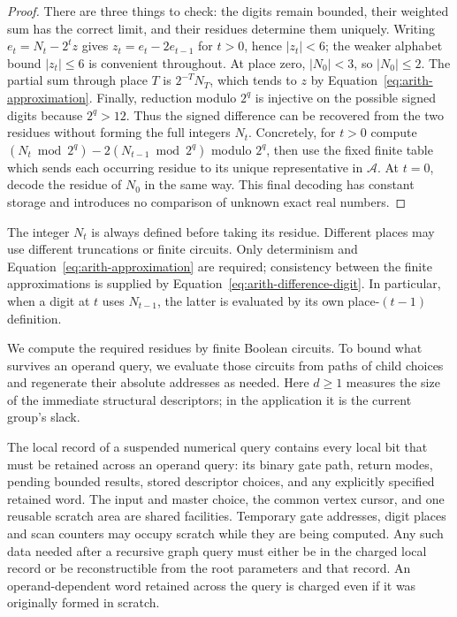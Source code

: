 \begin{proof}
There are three things to check: the digits remain bounded, their weighted sum has the correct limit, and their residues determine them uniquely. Writing $e_t=N_t-2^tz$ gives
$z_t=e_t-2e_{t-1}$ for $t>0$, hence $|z_t|<6$; the weaker alphabet
bound $|z_t|\leq6$ is convenient throughout.  At place zero,
$|N_0|<3$, so $|N_0|\leq2$.  The partial sum through place $T$ is
$2^{-T}N_T$, which tends to $z$ by Equation~\eqref{eq:arith-approximation}.
Finally, reduction modulo $2^q$ is injective on the possible signed
digits because $2^q>12$.  Thus the signed difference can be recovered
from the two residues without forming the full integers $N_t$.
Concretely, for $t>0$ compute
$(N_t\bmod 2^q)-2(N_{t-1}\bmod 2^q)$ modulo $2^q$, then use the
fixed finite table which sends each occurring residue to its unique
representative in $\mathcal A$.  At $t=0$, decode the residue of
$N_0$ in the same way.  This final decoding has constant storage and
introduces no comparison of unknown exact real numbers.
\end{proof}

The integer $N_t$ is always defined before taking its residue.
Different places may use different truncations or finite circuits.
Only determinism and Equation~\eqref{eq:arith-approximation} are
required; consistency between the finite approximations is supplied
by Equation~\eqref{eq:arith-difference-digit}.  In particular, when a
digit at $t$ uses $N_{t-1}$, the latter is evaluated by its own
place-$(t-1)$ definition.

We compute the required residues by finite Boolean circuits.  To bound
what survives an operand query, we evaluate those circuits from paths
of child choices and regenerate their absolute addresses as needed.
Here $d\geq1$ measures the size of the immediate structural descriptors;
in the application it is the current group's slack.

The local record of a suspended numerical query contains every local bit
that must be retained across an operand query: its binary gate path,
return modes, pending bounded results, stored descriptor choices, and
any explicitly specified retained word.  The input and master choice,
the common vertex cursor, and one reusable scratch area are shared
facilities.  Temporary gate addresses, digit places and scan counters
may occupy scratch while they are being computed.  Any such data needed
after a recursive graph query must either be in the charged local
record or be reconstructible from the root parameters and that record.
An operand-dependent word retained across the query is charged even if
it was originally formed in scratch.


